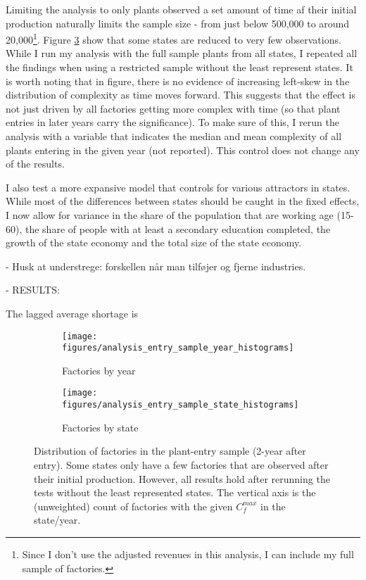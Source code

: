 \documentclass[11pt]{article}
\begin{document}
Limiting the analysis to only plants observed a set amount of time af their initial production naturally limits the sample size - from just below 500,000 to around 20,000\footnote{Since I don't use the adjusted revenues in this analysis, I can include my full sample of factories.}. Figure \ref{fig:new_entry_sample} show that some states are reduced to very few observations. While I run my analysis with the full sample plants from all states, I  repeated all the findings when using a restricted sample without the least represent states. It is worth noting that in figure, there is no evidence of increasing left-skew in the distribution of complexity as time moves forward. This suggests that the effect is not just driven by all factories getting more complex with time (so that plant entries in later years carry the significance). To make sure of this, I rerun the analysis with a variable that indicates the median and mean complexity of all plants entering in the given year (not reported). This control does not change any of the results.


I also test a more expansive model that controls for various attractors in states. While most of the differences between states should be caught in the fixed effects, I now allow for variance in the share of the population that are working age (15-60), the share of people with at least a secondary education completed, the growth of the state economy and the total size of the state economy. 

- Husk at understrege: forskellen når man tilføjer og fjerne industries.



- RESULTS:

The lagged average shortage is 

\begin{figure}
     \centering
     \begin{subfigure}[b]{0.45\textwidth}
         \centering
         \texttt{[image: figures/analysis\_entry\_sample\_year\_histograms]}
	 \caption{Factories by year}
         \label{fig:entry_by_year}
     \end{subfigure}
     \hfill
     \begin{subfigure}[b]{0.45\textwidth}
         \centering
         \texttt{[image: figures/analysis\_entry\_sample\_state\_histograms]}
	 \caption{Factories by state}
         \label{fig:entry_by_state}
     \end{subfigure}
     \caption{Distribution of factories in the plant-entry sample (2-year after entry). Some states only have a few factories that are observed after their initial production. However, all results hold after rerunning the tests without the least represented states. The vertical axis is the (unweighted) count of factories with the given $C^{max}_{f}$ in the state/year.}
        \label{fig:new_entry_sample}
\end{figure}
\end{document}
